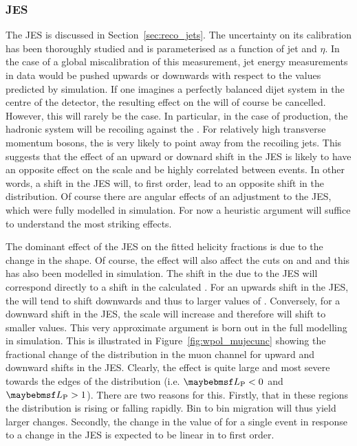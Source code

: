 \subsubsection{\acl{JES}}
\label{sec:wpol_syst_jec}
The \ac{JES} is discussed in Section~\ref{sec:reco_jets}. The uncertainty on its
calibration has been thoroughly studied and is parameterised as a function of
jet \Pt and $\eta$. In the case of a global miscalibration of this measurement,
jet energy measurements in data would be pushed upwards or downwards with
respect to the values predicted by simulation. If one imagines a perfectly
balanced dijet system in the centre of the detector, the resulting effect on the
\METv will of course be cancelled. However, this will rarely be the case. In
particular, in the case of \Wjets production, the hadronic system will be
recoiling against the \PW. For relatively high transverse momentum \PW bosons,
the \METv is very likely to point away from the recoiling jets. This suggests
that the effect of an upward or downard shift in the \ac{JES} is likely to have
an opposite effect on the \METv scale and be highly correlated between
events. In other words, a shift in the \ac{JES} will, to first order,
lead to an opposite shift in the \MET distribution. Of course there are angular
effects of an adjustment to the \ac{JES}, which were fully modelled in
simulation. For now a heuristic argument will suffice to understand the most
striking effects.

The dominant effect of the \ac{JES} on the fitted helicity fractions is due to
the change in the \LP shape. Of course, the effect will also affect the cuts on
\PtW and \MT and this has also been modelled in simulation. The shift in the
\MET due to the \ac{JES} will correspond directly to a shift in the calculated
\LP. For an upwards shift in the \ac{JES}, the \MET will tend to shift
downwards and thus to larger values of \LP. Conversely, for a downward shift in
the \ac{JES}, the \MET scale will increase and therefore \LP will shift
to smaller values. This very approximate argument is born out in the full
modelling in simulation. This is illustrated in Figure~\ref{fig:wpol_mujecunc}
showing the fractional change of the \LP distribution in the muon channel for
upward and downward shifts in the \ac{JES}. Clearly, the effect is quite
large and most severe towards the edges of the \LP distribution (i.e. $\LP < 0$
and $\LP > 1$). There are two reasons for this. Firstly, that in these regions
the \LP distribution is rising or falling rapidly. Bin to bin migration will
thus yield larger changes. Secondly, the change in the value of \LP for a single
event in response to a change in the \ac{JES} is expected to be linear
in \LP to first order.

